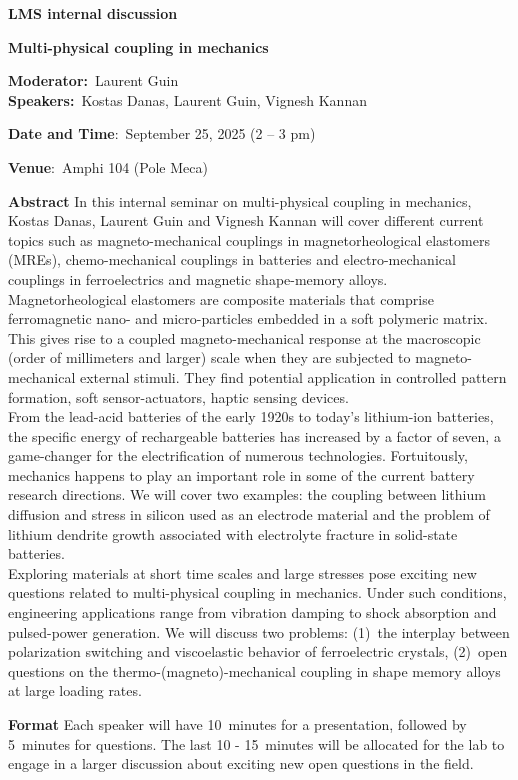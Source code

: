 \documentclass[a4paper,12pt,fleqn]{article}
\begin{document}
	\sffamily
\thispagestyle{titlepage}
\vspace*{-3em}
\begin{center}
	\huge \textbf{LMS internal discussion}
\end{center}
\begin{center}
	\Large 
	\textbf{Multi-physical coupling in mechanics} 
\end{center}
\begin{center}
	\large
	\textbf{Moderator:}~Laurent Guin \\
	\textbf{Speakers:}~Kostas Danas, Laurent Guin, Vignesh Kannan \\
	\vspace*{1em}
	{\large
	\textbf{Date and Time}:~September 25, 2025 (2 -- 3 pm)
	
	\textbf{Venue}:~Amphi 104 (Pole Meca) }
\end{center}
\vspace*{-1em}
\begin{myhlbox}{{\textbf{Abstract}}}
	In this internal seminar on multi-physical coupling in mechanics, Kostas Danas, Laurent Guin and Vignesh Kannan will cover different current topics such as magneto-mechanical couplings in magnetorheological elastomers (MREs), chemo-mechanical couplings in batteries and electro-mechanical couplings in ferroelectrics and magnetic shape-memory alloys. \\
	
	Magnetorheological elastomers are composite materials that comprise ferromagnetic nano- and micro-particles embedded in a soft polymeric matrix. This gives rise to a coupled magneto-mechanical response at the macroscopic (order of millimeters and larger) scale when they are subjected to magneto-mechanical external stimuli. They find potential application in controlled pattern formation, soft sensor-actuators, haptic sensing devices. \\
	
	From the lead-acid batteries of the early 1920s to today's lithium-ion batteries, the specific energy of rechargeable batteries has increased by a factor of seven, a game-changer for the electrification of numerous technologies. Fortuitously, mechanics happens to play an important role in some of the current battery research directions. We will cover two examples: the coupling between lithium diffusion and stress in silicon used as an electrode material and the problem of lithium dendrite growth associated with electrolyte fracture in solid-state batteries. \\
	
	Exploring materials at short time scales and large stresses pose exciting new questions related to multi-physical coupling in mechanics. Under such conditions, engineering applications range from vibration damping to shock absorption and pulsed-power generation. We will discuss two problems: (1)~the interplay between polarization switching and viscoelastic behavior of ferroelectric crystals, (2)~open questions on the thermo-(magneto)-mechanical coupling in shape memory alloys at large loading rates.   
	
\end{myhlbox}

\begin{myhlbox}{\textbf{Format}}
	Each speaker will have 10~minutes for a presentation, followed by 5~minutes for questions. The last 10 - 15~minutes will be allocated for the lab to engage in a larger discussion about exciting new open questions in the field. 
\end{myhlbox}
\end{document}
